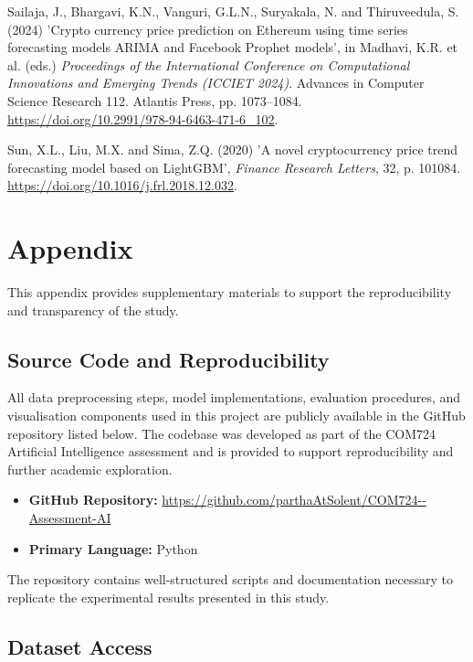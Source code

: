 \documentclass[12pt,a4paper]{report}
\begin{document}
\vspace{0.3cm}
\noindent Sailaja, J., Bhargavi, K.N., Vanguri, G.L.N., Suryakala, N. and Thiruveedula, S. (2024) 'Crypto currency price prediction on Ethereum using time series forecasting models ARIMA and Facebook Prophet models', in Madhavi, K.R. et al. (eds.) \textit{Proceedings of the International Conference on Computational Innovations and Emerging Trends (ICCIET 2024)}. Advances in Computer Science Research 112. Atlantis Press, pp. 1073--1084. \url{https://doi.org/10.2991/978-94-6463-471-6\_102}.

\vspace{0.3cm}
\noindent Sun, X.L., Liu, M.X. and Sima, Z.Q. (2020) 'A novel cryptocurrency price trend forecasting model based on LightGBM', \textit{Finance Research Letters}, 32, p. 101084. \url{https://doi.org/10.1016/j.frl.2018.12.032}.


\chapter*{Appendix}

This appendix provides supplementary materials to support the reproducibility and transparency of the study.

\section*{Source Code and Reproducibility}

All data preprocessing steps, model implementations, evaluation procedures, and visualisation components used in this project are publicly available in the GitHub repository listed below. The codebase was developed as part of the COM724 Artificial Intelligence assessment and is provided to support reproducibility and further academic exploration.

\begin{itemize}
    \item \textbf{GitHub Repository:} \url{https://github.com/parthaAtSolent/COM724--Assessment-AI}
    \item \textbf{Primary Language:} Python
\end{itemize}

The repository contains well-structured scripts and documentation necessary to replicate the experimental results presented in this study.

\section*{Dataset Access}
\end{document}
